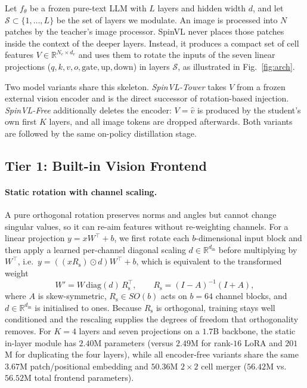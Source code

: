 \documentclass[10pt,twocolumn,letterpaper]{article}
\newcommand{\modelname}{SpinVL}
\begin{document}
Let $f_\theta$ be a frozen pure-text LLM with $L$ layers and hidden width
$d$, and let $\mathcal{S}\subset\{1,\dots,L\}$ be the set of layers we
modulate. An image is processed into $N$ patches by the teacher's image
processor. \modelname{} never places those patches inside the context of the
deeper layers. Instead, it produces a compact set of cell features
$V\in\mathbb{R}^{N_c\times d_v}$ and uses them to rotate the inputs of the
seven linear projections ($q,k,v,o,\text{gate},\text{up},\text{down}$) in
layers $\mathcal{S}$, as illustrated in Fig.~\ref{fig:arch}.

Two model variants share this skeleton. \emph{\modelname-Tower} takes $V$
from a frozen external vision encoder and is the direct successor of
rotation-based injection. \emph{\modelname-Free} additionally deletes the
encoder: $V=\hat{v}$ is produced by the student's own first $K$ layers, and
all image tokens are dropped afterwards. Both variants are followed by the
same on-policy distillation stage.

\subsection{Tier 1: Built-in Vision Frontend}
\label{sec:frontend}

\paragraph{Static rotation with channel scaling.}
A pure orthogonal rotation preserves norms and angles but cannot change
singular values, so it can re-aim features without re-weighting channels. For a
linear projection $y = x W^{\top} + b$, we first rotate each $b$-dimensional
input block and then apply a learned per-channel diagonal scaling
$d\in\mathbb{R}^{d_{\text{in}}}$ before multiplying by $W^{\top}$, i.e.\
$y = ((x R_{\mathrm{s}})\odot d)W^{\top} + b$, which is equivalent to the
transformed weight
\begin{equation}
W' = W\,\mathrm{diag}(d)\,R_{\mathrm{s}}^{\top},
\qquad
R_{\mathrm{s}} = (I-A)^{-1}(I+A),
\label{eq:static}
\end{equation}
where $A$ is skew-symmetric, $R_{\mathrm{s}}\in SO(b)$ acts on $b{=}64$
channel blocks, and $d\in\mathbb{R}^{d_{\text{in}}}$ is initialised to ones.
Because $R_{\mathrm{s}}$ is orthogonal, training stays well conditioned and
the rescaling supplies the degrees of freedom that orthogonality removes. For
$K{=}4$ layers and seven projections on a $1.7$B backbone, the static
in-layer module has $2.40$M parameters (versus $2.49$M for rank-$16$ LoRA and
$201$M for duplicating the four layers), while all encoder-free variants share
the same $3.67$M patch/positional embedding and $50.36$M $2{\times}2$ cell
merger ($56.42$M vs.\ $56.52$M total frontend parameters).
\end{document}
